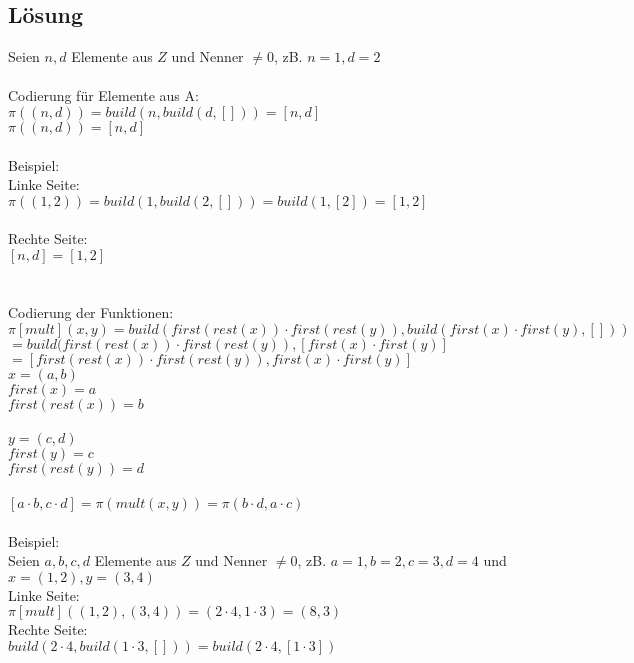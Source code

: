\documentclass[12pt,runningheads,a4paper]{llncs}
\begin{document}
\subsection*{Lösung}
Seien $n,d$ Elemente aus $Z$ und Nenner $\neq 0$, zB. $n=1, d=2$  \\
\\
Codierung für Elemente aus A:\\
$\pi((n,d)) = build(n, build(d,[])) = [n,d]$ \\
$\pi((n,d)) = [n,d]$\\
\\
Beispiel:\\
Linke Seite:\\
$\pi((1,2)) = build(1, build(2, [])) = build(1,[2]) = [1,2]$\\
\\
Rechte Seite:\\
$[n,d] = [1,2]$\\
\\
\\
Codierung der Funktionen:\\
$\pi[mult](x, y) = build(first(rest(x)) \cdot first(rest(y)), build(first(x) \cdot first(y), []))$\\
$= build(first(rest(x))\cdot first(rest(y)), [first(x)\cdot first(y)]$\\
$= [first(rest(x))\cdot first(rest(y)), first(x)\cdot first(y)]$\\
$x = (a,b)$\\
$first (x) = a$\\
$first(rest(x)) = b$\\
\\
$y = (c,d)$\\
$first(y) = c$\\
$first(rest(y)) = d$\\
\\
$[a\cdot b, c\cdot d] = \pi(mult(x,y))= \pi (b\cdot d, a\cdot c)$\\
\\
Beispiel:\\
Seien $a, b, c, d$ Elemente aus $Z$ und Nenner $\neq 0$, zB. $a=1, b=2, c= 3, d=4$ und $x = (1,2), y = (3,4)$ \\
Linke Seite:\\
$\pi[mult]((1,2), (3,4)) = (2 \cdot 4, 1 \cdot 3) = (8, 3)$\\
Rechte Seite:\\
$build(2\cdot 4, build(1\cdot 3, []))= build(2\cdot 4, [1 \cdot 3])$\\
\end{document}
